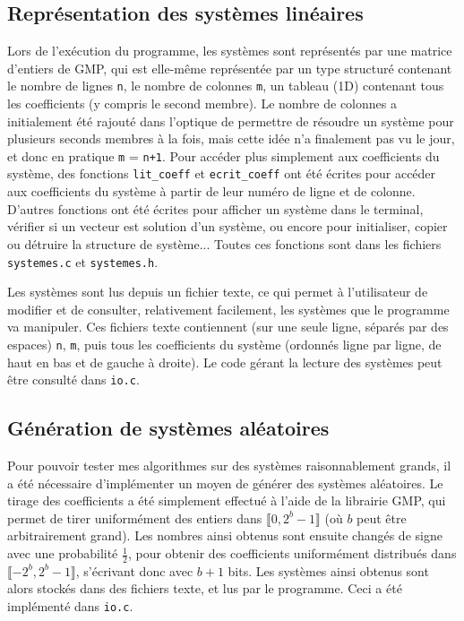 \documentclass[french]{article}
\begin{document}
\subsection{Représentation des systèmes linéaires} \label{subsec:systemes}
Lors de l'exécution du programme, les systèmes sont représentés par une matrice d'entiers de GMP, qui est elle-même représentée par un type structuré contenant le nombre de lignes {\tt n}, le nombre de colonnes {\tt m}, un tableau (1D) contenant tous les coefficients (y compris le second membre). Le nombre de colonnes a initialement été rajouté dans l'optique de permettre de résoudre un système pour plusieurs seconds membres à la fois, mais cette idée n'a finalement pas vu le jour, et donc en pratique {\tt m} = {\tt n+1}.
Pour accéder plus simplement aux coefficients du système, des fonctions {\tt lit\_coeff} et {\tt ecrit\_coeff} ont été écrites pour accéder aux coefficients du système à partir de leur numéro de ligne et de colonne.
D'autres fonctions ont été écrites pour afficher un système dans le terminal, vérifier si un vecteur est solution d'un système, ou encore pour initialiser, copier ou détruire la structure de système... Toutes ces fonctions sont dans les fichiers {\tt systemes.c} et {\tt systemes.h}.
\par Les systèmes sont lus depuis un fichier texte, ce qui permet à l'utilisateur de modifier et de consulter, relativement facilement, les systèmes que le programme va manipuler. Ces fichiers texte contiennent (sur une seule ligne, séparés par des espaces) {\tt n}, {\tt m}, puis tous les coefficients du système (ordonnés ligne par ligne, de haut en bas et de gauche à droite). Le code gérant la lecture des systèmes peut être consulté dans {\tt io.c}.
\subsection{Génération de systèmes aléatoires}
Pour pouvoir tester mes algorithmes sur des systèmes raisonnablement grands, il a été nécessaire d'implémenter un moyen de générer des systèmes aléatoires. Le tirage des coefficients a été simplement effectué à l'aide de la librairie GMP, qui permet de tirer uniformément des entiers dans $\llbracket0,2^b-1\rrbracket$ (où $b$ peut être arbitrairement grand). Les nombres ainsi obtenus sont ensuite changés de signe avec une probabilité $\frac{1}{2}$, pour obtenir des coefficients uniformément distribués dans $\llbracket-2^b,2^b-1\rrbracket$, s'écrivant donc avec $b+1$ bits. Les systèmes ainsi obtenus sont alors stockés dans des fichiers texte, et lus par le programme. Ceci a été implémenté dans {\tt io.c}.
\end{document}
